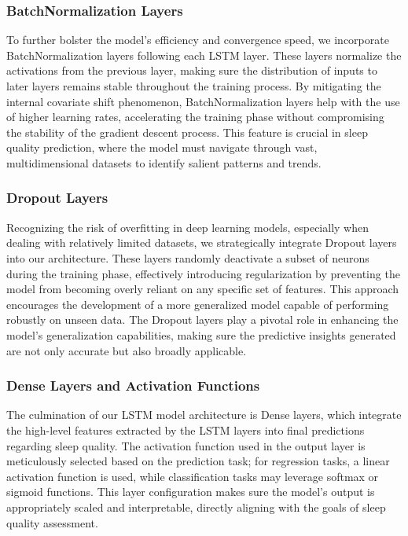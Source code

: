 \documentclass[10pt]{extarticle}
\begin{document}
\subsubsection{BatchNormalization Layers}

To further bolster the model's efficiency and convergence speed, we incorporate BatchNormalization layers following each LSTM layer. These layers normalize the activations from the previous layer, making sure the distribution of inputs to later layers remains stable throughout the training process. By mitigating the internal covariate shift phenomenon, BatchNormalization layers help with the use of higher learning rates, accelerating the training phase without compromising the stability of the gradient descent process. This feature is crucial in sleep quality prediction, where the model must navigate through vast, multidimensional datasets to identify salient patterns and trends.

\subsubsection{Dropout Layers}

Recognizing the risk of overfitting in deep learning models, especially when dealing with relatively limited datasets, we strategically integrate Dropout layers into our architecture. These layers randomly deactivate a subset of neurons during the training phase, effectively introducing regularization by preventing the model from becoming overly reliant on any specific set of features. This approach encourages the development of a more generalized model capable of performing robustly on unseen data. The Dropout layers play a pivotal role in enhancing the model's generalization capabilities, making sure the predictive insights generated are not only accurate but also broadly applicable.

\subsubsection{Dense Layers and Activation Functions}

The culmination of our LSTM model architecture is Dense layers, which  integrate the high-level features extracted by the LSTM layers into final predictions regarding sleep quality. The activation function used in the output layer is meticulously selected based on the prediction task; for regression tasks, a linear activation function is used, while classification tasks may leverage softmax or sigmoid functions. This layer configuration makes sure the model's output is appropriately scaled and interpretable, directly aligning with the goals of sleep quality assessment.
\end{document}
